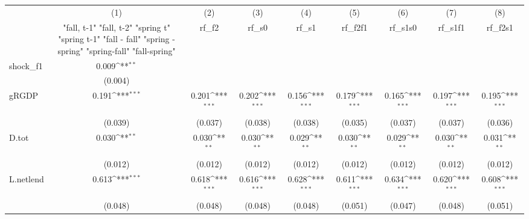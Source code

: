 {
\def\sym#1{\ifmmode^{#1}\else\(^{#1}\)\fi}
\begin{tabular}{l*{8}{c}}
\toprule
            &\multicolumn{1}{c}{(1)}&\multicolumn{1}{c}{(2)}&\multicolumn{1}{c}{(3)}&\multicolumn{1}{c}{(4)}&\multicolumn{1}{c}{(5)}&\multicolumn{1}{c}{(6)}&\multicolumn{1}{c}{(7)}&\multicolumn{1}{c}{(8)}\\
            &\multicolumn{1}{c}{  "fall, t-1" "fall, t-2" "spring t" "spring t-1"  "fall - fall" "spring - spring" "spring-fall" "fall-spring" }&\multicolumn{1}{c}{rf\_f2}&\multicolumn{1}{c}{rf\_s0}&\multicolumn{1}{c}{rf\_s1}&\multicolumn{1}{c}{rf\_f2f1}&\multicolumn{1}{c}{rf\_s1s0}&\multicolumn{1}{c}{rf\_s1f1}&\multicolumn{1}{c}{rf\_f2s1}\\
\midrule
shock\_f1    &       0.009\sym{**} &                     &                     &                     &                     &                     &                     &                     \\
            &     (0.004)         &                     &                     &                     &                     &                     &                     &                     \\
\addlinespace
gRGDP       &       0.191\sym{***}&       0.201\sym{***}&       0.202\sym{***}&       0.156\sym{***}&       0.179\sym{***}&       0.165\sym{***}&       0.197\sym{***}&       0.195\sym{***}\\
            &     (0.039)         &     (0.037)         &     (0.038)         &     (0.038)         &     (0.035)         &     (0.037)         &     (0.037)         &     (0.036)         \\
\addlinespace
D.tot       &       0.030\sym{**} &       0.030\sym{**} &       0.030\sym{**} &       0.029\sym{**} &       0.030\sym{**} &       0.029\sym{**} &       0.030\sym{**} &       0.031\sym{**} \\
            &     (0.012)         &     (0.012)         &     (0.012)         &     (0.012)         &     (0.012)         &     (0.012)         &     (0.012)         &     (0.012)         \\
\addlinespace
L.netlend   &       0.613\sym{***}&       0.618\sym{***}&       0.616\sym{***}&       0.628\sym{***}&       0.611\sym{***}&       0.634\sym{***}&       0.620\sym{***}&       0.608\sym{***}\\
            &     (0.048)         &     (0.048)         &     (0.048)         &     (0.048)         &     (0.051)         &     (0.047)         &     (0.048)         &     (0.051)         \\

\end{tabular}}
